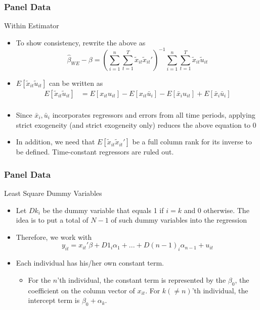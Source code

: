 \documentclass{beamer}
\begin{document}
\begin{frame}
\frametitle{Panel Data}
Within Estimator
\begin{itemize}
\item To show consistency, rewrite the above as
\[
\hat{\beta}_{WE}-\beta=\left(\sum_{i=1}^n\sum_{t=1}^T \tilde{x}_{it}\tilde{x}_{it}'\right)^{-1}\sum_{i=1}^n\sum_{t=1}^T \tilde{x}_{it}\tilde{u}_{it}
\]
\item $E[\tilde{x}_{it}\tilde{u}_{it}]$ can be written as
\[
\begin{aligned}
E[\tilde{x}_{it}\tilde{u}_{it}]&=E[x_{it}u_{it}]-E[x_{it}\bar{u}_i]-E[\bar{x}_iu_{it}]+E[\bar{x}_i\bar{u}_i]\\
\end{aligned}
\]
\item Since $\bar{x}_i, \bar{u}_i$ incorporates regressors and errors from all time periods, applying strict exogeneity (and strict exogeneity only) reduces the above equation to 0
\item  In addition, we need that $E\left[\tilde{x}_{it}\tilde{x}_{it}'\right]$ be a full column rank for its inverse to be defined. Time-constant regressors are ruled out.
\end{itemize}
\end{frame}

\begin{frame}
\frametitle{Panel Data}
Least Square Dummy Variables
\begin{itemize}
\item Let $Dk_i$ be the dummy variable that equals 1 if $i=k$ and 0 otherwise. The idea is to put a total of $N-1$ of such dummy variables into the regression
\item Therefore, we work with
\small{\[
y_{it}=x_{it}'\beta + D1_i\alpha_1+...+D(n-1)_i\alpha_{n-1}+u_{it} 
\]}\normalsize
\item Each individual has his/her own constant term.
\begin{itemize}
\item For the $n$'th individual, the constant term is represented by the $\beta_0$, the coefficient on the column vector of $x_{it}$. For $k(\neq n)$'th individual, the intercept term is $\beta_0 + \alpha_k$. 
\end{itemize}
\end{itemize}
\end{frame}
\end{document}
